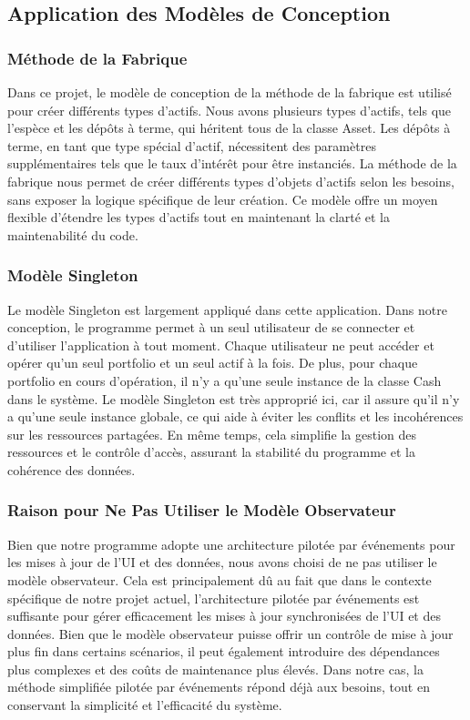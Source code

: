 \documentclass{article}
\begin{document}
\subsection{Application des Modèles de Conception}
\subsubsection{Méthode de la Fabrique}
Dans ce projet, le modèle de conception de la méthode de la fabrique est utilisé pour créer différents types d'actifs. Nous avons plusieurs types d'actifs, tels que l'espèce et les dépôts à terme, qui héritent tous de la classe Asset. Les dépôts à terme, en tant que type spécial d'actif, nécessitent des paramètres supplémentaires tels que le taux d'intérêt pour être instanciés. La méthode de la fabrique nous permet de créer différents types d'objets d'actifs selon les besoins, sans exposer la logique spécifique de leur création. Ce modèle offre un moyen flexible d'étendre les types d'actifs tout en maintenant la clarté et la maintenabilité du code.
\subsubsection{Modèle Singleton}
Le modèle Singleton est largement appliqué dans cette application. Dans notre conception, le programme permet à un seul utilisateur de se connecter et d'utiliser l'application à tout moment. Chaque utilisateur ne peut accéder et opérer qu'un seul portfolio et un seul actif à la fois. De plus, pour chaque portfolio en cours d'opération, il n'y a qu'une seule instance de la classe Cash dans le système. Le modèle Singleton est très approprié ici, car il assure qu'il n'y a qu'une seule instance globale, ce qui aide à éviter les conflits et les incohérences sur les ressources partagées. En même temps, cela simplifie la gestion des ressources et le contrôle d'accès, assurant la stabilité du programme et la cohérence des données.
\subsubsection{Raison pour Ne Pas Utiliser le Modèle Observateur}
Bien que notre programme adopte une architecture pilotée par événements pour les mises à jour de l'UI et des données, nous avons choisi de ne pas utiliser le modèle observateur. Cela est principalement dû au fait que dans le contexte spécifique de notre projet actuel, l'architecture pilotée par événements est suffisante pour gérer efficacement les mises à jour synchronisées de l'UI et des données. Bien que le modèle observateur puisse offrir un contrôle de mise à jour plus fin dans certains scénarios, il peut également introduire des dépendances plus complexes et des coûts de maintenance plus élevés. Dans notre cas, la méthode simplifiée pilotée par événements répond déjà aux besoins, tout en conservant la simplicité et l'efficacité du système.
\end{document}
